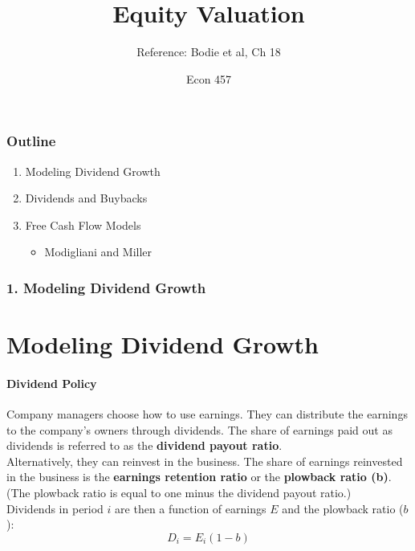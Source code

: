 \documentclass{beamer}
\title{Equity Valuation}
\subtitle{Reference: Bodie et al, Ch 18}
\author{Econ 457}
\date{\week}
\begin{document}
\frame{\titlepage}

\begin{frame}
    \frametitle{Outline}

    \begin{enumerate}
        \item Modeling Dividend Growth
        \item Dividends and Buybacks
        \item Free Cash Flow Models
            \begin{itemize}
                \item Modigliani and Miller
            \end{itemize}
    \end{enumerate}

\end{frame}



\begin{frame}[t]
    \frametitle{1. Modeling Dividend Growth}
    \section{Modeling Dividend Growth}
    \framesubtitle{Dividend Policy}

    Company managers choose how to use earnings.  They can distribute the earnings to 
    the company's owners through dividends.  The share of earnings paid out as dividends is referred to as the \textbf{dividend payout ratio}.\\
    \vspace{1em}
    Alternatively, they can reinvest in the business.  The share of earnings reinvested in the business is the \textbf{earnings retention ratio} or the \textbf{plowback ratio (b)}.   (The plowback ratio is equal to one minus the dividend payout ratio.)\\
    \vspace{1em}
    Dividends in period $i$ are then a function of earnings $E$ and the plowback ratio ($b$):
    $$D_i = E_i (1- b)$$
    \vspace{1em}
    
\end{frame}
\end{document}
